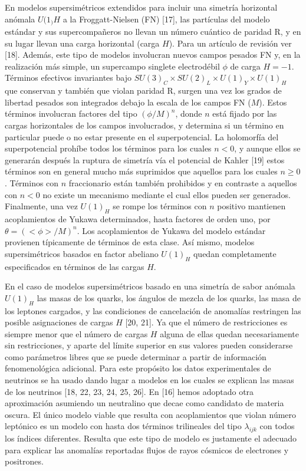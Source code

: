 \begin{ideas}
En modelos supersimétricos extendidos para incluir una simetría horizontal anómala $U(1_)H$ 
a la Froggatt-Nielsen (FN) [17], las partículas del modelo estándar y sus supercompañeros no 
llevan un número cuántico de paridad R, y en su lugar llevan una carga horizontal (carga $H$). 
Para un artículo de revisión ver [18]. Además, este tipo de modelos involucran nuevos campos 
pesados FN y, en la realización más simple, un supercampo singlete electrodébil $\phi$ de carga $H = -1$. 
Términos efectivos invariantes bajo $SU(3)_C\times SU(2)_L\times U(1)_Y\times U(1)_H$  que conservan y también 
que violan paridad R, surgen una vez los grados de libertad pesados son integrados debajo la 
escala de los campos FN ($M$). Estos términos involucran factores del tipo $(\phi/M)^n$, donde $n$ está 
fijado  por las cargas horizontales de los campos involucrados, y determina si un término en 
particular puede o no estar presente en el superpotencial. La holomorfía del superpotencial 
prohíbe todos los términos para los cuales $n < 0$, y aunque ellos se generarán después la 
ruptura de simetría vía el potencial de Kahler [19] estos términos son en general mucho 
más suprimidos que aquellos para los cuales $n \geq 0$. Términos con $n$ fraccionario están 
también prohibidos y en contraste a aquellos con $n < 0$ no existe un mecanismo mediante 
el cual ellos pueden ser generados. Finalmente, una vez $U(1)_H$ se rompe los términos 
con $n$ positivo mantienen acoplamientos de Yukawa determinados, hasta factores de orden uno, 
por $\theta=(<\phi>/M)^n$. Los acoplamientos de Yukawa del modelo estándar provienen típicamente 
de términos de esta clase. Así mismo, modelos supersimétricos basados en factor abeliano 
$U(1)_H$ quedan completamente especificados en términos de las cargas $H$.

En el caso de modelos supersimétricos basado en una simetría de sabor anómala $U(1)_H$ 
las masas de los quarks, los ángulos de mezcla de los quarks, las masa de los leptones cargados, 
y las condiciones de cancelación de anomalías restringen las posible asignaciones de cargas $H$ [20, 21]. 
Ya que el número de restricciones es siempre menor que el número de cargas $H$ alguna de ellas 
quedan necesariamente sin restricciones, y aparte del límite superior en sus valores pueden 
considerarse como parámetros libres que se puede determinar a partir de información 
fenomenológica adicional. Para este propósito los datos experimentales de neutrinos 
se ha usado dando lugar a modelos en los cuales se explican las masas de los 
neutrinos [18, 22, 23, 24, 25, 26]. En [16] hemos adoptado otra aproximación 
asumiendo un neutralino que decae como candidato de materia oscura. El único modelo 
viable que resulta con acoplamientos que violan número leptónico es un modelo con 
hasta dos términos trilineales del tipo $\lambda_{ijk}$ con todos los índices diferentes. 
Resulta que este tipo de modelo es justamente el adecuado para explicar las anomalías 
reportadas flujos de rayos cósmicos de electrones y positrones.


\end{ideas}
